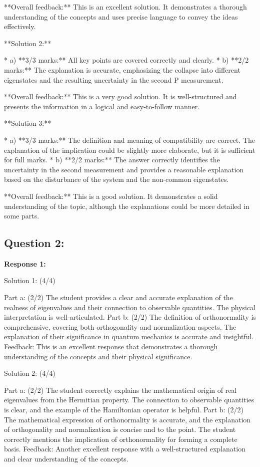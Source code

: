 \documentclass[a4paper,11pt]{article}
\begin{document}
**Overall feedback:** This is an excellent solution. It demonstrates a thorough understanding of the concepts and uses precise language to convey the ideas effectively.

**Solution 2:**

* a) **3/3 marks:** All key points are covered correctly and clearly.
* b) **2/2 marks:** The explanation is accurate, emphasizing the collapse into different eigenstates and the resulting uncertainty in the second P measurement.

**Overall feedback:** This is a very good solution. It is well-structured and presents the information in a logical and easy-to-follow manner.

**Solution 3:**

* a) **3/3 marks:** The definition and meaning of compatibility are correct. The explanation of the implication could be slightly more elaborate, but it is sufficient for full marks.
* b) **2/2 marks:** The answer correctly identifies the uncertainty in the second measurement and provides a reasonable explanation based on the disturbance of the system and the non-common eigenstates.

**Overall feedback:** This is a good solution. It demonstrates a solid understanding of the topic, although the explanations could be more detailed in some parts.


\subsection*{Question 2:}

\textbf{Response 1:}

Solution 1: (4/4)

Part a: (2/2) The student provides a clear and accurate explanation of the realness of eigenvalues and their connection to observable quantities. The physical interpretation is well-articulated.
Part b: (2/2) The definition of orthonormality is comprehensive, covering both orthogonality and normalization aspects. The explanation of their significance in quantum mechanics is accurate and insightful.
Feedback: This is an excellent response that demonstrates a thorough understanding of the concepts and their physical significance.

Solution 2: (4/4)

Part a: (2/2) The student correctly explains the mathematical origin of real eigenvalues from the Hermitian property. The connection to observable quantities is clear, and the example of the Hamiltonian operator is helpful.
Part b: (2/2) The mathematical expression of orthonormality is accurate, and the explanation of orthogonality and normalization is concise and to the point. The student correctly mentions the implication of orthonormality for forming a complete basis.
Feedback: Another excellent response with a well-structured explanation and clear understanding of the concepts.
\end{document}
